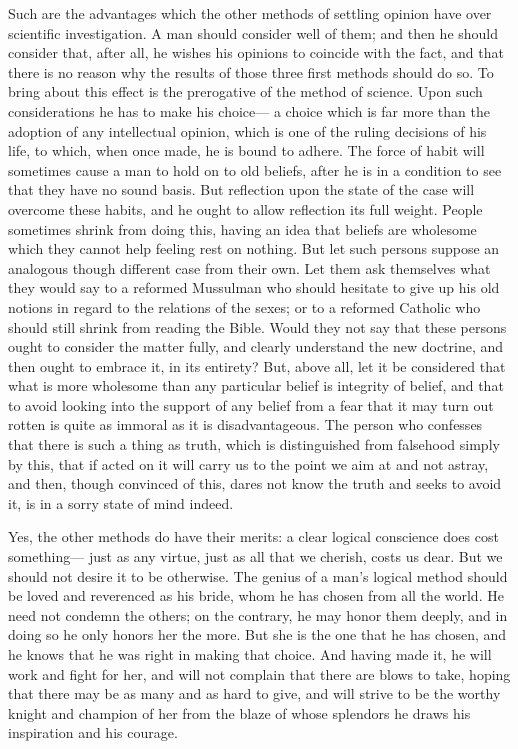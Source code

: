 Such are the advantages which the other methods of settling opinion have over scientific investigation. A man should consider well of them; and then he should consider that, after all, he wishes his opinions to coincide with the fact, and that there is no reason why the results of those three first methods should do so. To bring about this effect is the prerogative of the method of science. Upon such considerations he has to make his choice--- a choice which is far more than the adoption of any intellectual opinion, which is one of the ruling decisions of his life, to which, when once made, he is bound to adhere. The force of habit will sometimes cause a man to hold on to old beliefs, after he is in a condition to see that they have no sound basis. But reflection upon the state of the case will overcome these habits, and he ought to allow reflection its full weight. People sometimes shrink from doing this, having an idea that beliefs are wholesome which they cannot help feeling rest on nothing. But let such persons suppose an analogous though different case from their own. Let them ask themselves what they would say to a reformed Mussulman who should hesitate to give up his old notions in regard to the relations of the sexes; or to a reformed Catholic who should still shrink from reading the Bible. Would they not say that these persons ought to consider the matter fully, and clearly understand the new doctrine, and then ought to embrace it, in its entirety? But, above all, let it be considered that what is more wholesome than any particular belief is integrity of belief, and that to avoid looking into the support of any belief from a fear that it may turn out rotten is quite as immoral as it is disadvantageous. The person who confesses that there is such a thing as truth, which is distinguished from falsehood simply by this, that if acted on it will carry us to the point we aim at and not astray, and then, though convinced of this, dares not know the truth and seeks to avoid it, is in a sorry state of mind indeed.

Yes, the other methods do have their merits: a clear logical conscience does cost something--- just as any virtue, just as all that we cherish, costs us dear. But we should not desire it to be otherwise.  The genius of a man's logical method should be loved and reverenced as his bride, whom he has chosen from all the world.  He need not condemn the others; on the contrary, he may honor them deeply, and in doing so he only honors her the more.  But she is the one that he has chosen, and he knows that he was right in making that choice.  And having made it, he will work and fight for her, and will not complain that there are blows to take, hoping that there may be as many and as hard to give, and will strive to be the worthy knight and champion of her from the blaze of whose splendors he draws his inspiration and his courage.

